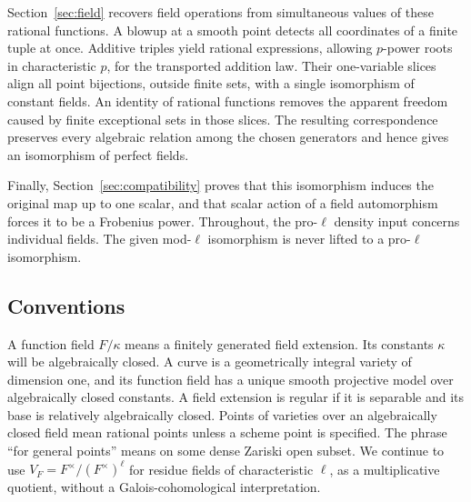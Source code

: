 Section~\ref{sec:field} recovers field operations from simultaneous
values of these rational functions. A blowup at a smooth point detects
all coordinates of a finite tuple at once. Additive triples yield
rational expressions, allowing $p$-power roots in characteristic $p$,
for the transported addition law.
Their one-variable slices align all point bijections, outside finite
sets, with a single isomorphism of constant fields. An identity of rational functions
removes the apparent freedom caused by finite exceptional sets in
those slices. The resulting correspondence preserves every algebraic
relation among the chosen generators and hence gives an isomorphism
of perfect fields.

Finally, Section~\ref{sec:compatibility} proves that this isomorphism
induces the original map up to one scalar, and that scalar action of
a field automorphism forces it to be a Frobenius power. Throughout,
the pro-$\ell$ density input concerns individual fields. The given
mod-$\ell$ isomorphism is never lifted to a pro-$\ell$ isomorphism.

\subsection{Conventions}

A function field $F/\kappa$ means a finitely generated field extension.
Its constants $\kappa$ will be algebraically closed. A curve is a
geometrically integral variety of dimension one, and its function field
has a unique smooth projective model over algebraically closed constants.
A field extension is regular if it is separable and its base is
relatively algebraically closed. Points of varieties over an
algebraically closed field mean rational points unless a scheme point
is specified. The phrase ``for general points'' means on some dense
Zariski open subset. We continue to use
$V_F=F^\times/(F^\times)^\ell$ for residue fields of characteristic
$\ell$, as a multiplicative quotient, without a Galois-cohomological
interpretation.
